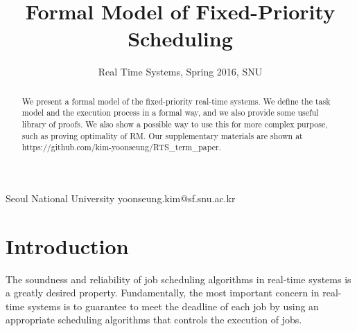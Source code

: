 \documentclass[nocopyrightspace]{sigplanconf}
\begin{document}
\setlength{\pdfpageheight}{\paperheight}
\setlength{\pdfpagewidth}{\paperwidth}






\title{ Formal Model of Fixed-Priority Scheduling }
\subtitle{ Real Time Systems, Spring 2016, SNU}

           {Seoul National University}
           {yoonseung.kim@sf.snu.ac.kr}

\maketitle

\begin{abstract}
We present a formal model of the fixed-priority real-time systems. We define the task model
and the execution process in a formal way, and we also provide some useful library of proofs. We also show
a possible way to use this for more complex purpose, such as proving optimality of RM.
Our supplementary materials are shown at https://github.com/kim-yoonseung/RTS\_term\_paper.

\end{abstract}

\section{Introduction}

The soundness and reliability of job scheduling algorithms in real-time systems is a greatly desired property. Fundamentally, the most important concern in real-time systems is to guarantee to meet the deadline of each job by using an appropriate scheduling algorithms that controls the execution of jobs.
\end{document}
